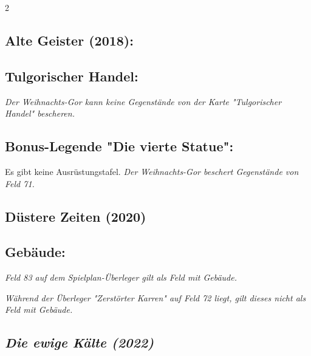\documentclass[10pt, a4paper, oneside]{book}
\newcommand{\fan}[1]{\textit{#1}}
\begin{document}
\begin{multicols*}{2}
\begin{bgcolor}[color-BB]
\end{bgcolor}


\begin{bgcolor}[color-AG]
\section{Alte Geister (2018):}

\subsection{Tulgorischer Handel:}

\fan{Der Weihnachts-Gor kann keine Gegenstände von der Karte "Tulgorischer Handel" bescheren.}


\subsection{Bonus-Legende "Die vierte Statue":}

Es gibt keine Ausrüstungstafel. \fan{Der Weihnachts-Gor beschert Gegenstände von Feld 71.}

\end{bgcolor}



\begin{bgcolor}[color-DZ]
\section{Düstere Zeiten (2020)}


\subsection{Gebäude:}

\fan{Feld 83 auf dem Spielplan-Überleger gilt als Feld mit Gebäude.}

\fan{Während der Überleger "Zerstörter Karren" auf Feld 72 liegt, gilt dieses nicht als Feld mit Gebäude.}

\end{bgcolor}





\columnbreak




\begin{bgcolor}
\section{\fan{Die ewige Kälte (2022)}}


\end{bgcolor}
\end{multicols*}
\end{document}
